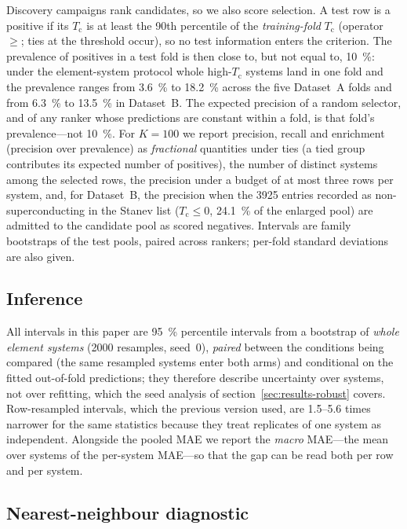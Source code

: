 \documentclass{iopjournal}
\newcommand{\Tc}{T_{\mathrm c}}
\begin{document}
Discovery campaigns rank candidates, so we also score selection. A test row is a positive if its
$\Tc$ is at least the 90th percentile of the \emph{training-fold} $\Tc$ (operator $\ge$; ties at
the threshold occur), so no test information enters the criterion. The prevalence of positives in a
test fold is then close to, but not equal to, \SI{10}{\percent}: under the element-system protocol
whole high-$\Tc$ systems land in one fold and the prevalence ranges from \SI{3.6}{\percent} to
\SI{18.2}{\percent} across the five Dataset~A folds and from \SI{6.3}{\percent} to
\SI{13.5}{\percent} in Dataset~B. The expected precision of a random selector, and of any ranker
whose predictions are constant within a fold, is that fold's prevalence---not \SI{10}{\percent}.
For $K = \num{100}$ we report precision, recall and enrichment (precision over prevalence) as
\emph{fractional} quantities under ties (a tied group contributes its expected number of positives),
the number of distinct systems among the selected rows, the precision under a budget of at most
three rows per system, and, for Dataset~B, the precision when the \num{3925} entries recorded as non-superconducting in the Stanev list ($\Tc \le 0$, \SI{24.1}{\percent} of the enlarged pool) are
admitted to the candidate pool as scored negatives. Intervals are family bootstraps of the test
pools, paired across rankers; per-fold standard deviations are also given.

\subsection{Inference}
\label{sec:inference}

All intervals in this paper are \SI{95}{\percent} percentile intervals from a bootstrap of
\emph{whole element systems} (\num{2000} resamples, seed~0), \emph{paired} between the conditions
being compared (the same resampled systems enter both arms) and conditional on the fitted
out-of-fold predictions; they therefore describe uncertainty over systems, not over refitting,
which the seed analysis of section~\ref{sec:results-robust} covers. Row-resampled intervals, which
the previous version used, are \numrange{1.5}{5.6} times narrower for the same statistics because they
treat replicates of one system as independent. Alongside the pooled MAE we report the
\emph{macro} MAE---the mean over systems of the per-system MAE---so that the gap can be read both
per row and per system.

\subsection{Nearest-neighbour diagnostic}
\end{document}
